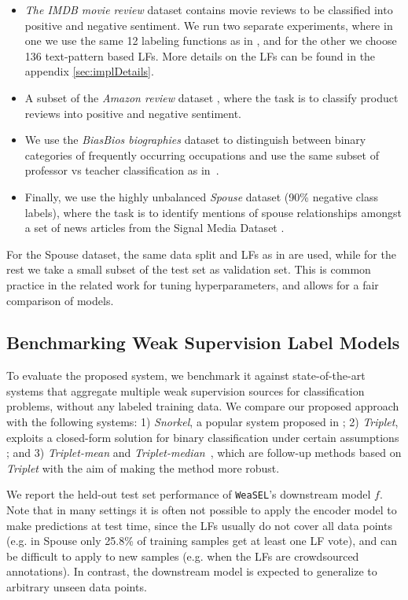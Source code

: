 \documentclass{article}
\newcommand{\weasel}{\texttt{WeaSEL}}\newcommand{\brackets}[1]{\left( #1 \right)}
\begin{document}
\begin{itemize}
    \item 
    \textit{The IMDB movie review} dataset \cite{IMDB} contains  movie reviews to be classified into positive and negative sentiment. We run two separate experiments, where in one we use the same 12 labeling functions as in \cite{TripletsMean}, and for the other we choose 136 text-pattern based LFs. More details on the LFs can be found in the appendix \ref{sec:implDetails}.
    \item
    A subset of the \textit{Amazon review} dataset \cite{Amazon}, where the task is to classify product reviews into positive and negative sentiment.
    \item
    We use the \textit{BiasBios biographies} dataset \cite{biasBios} to distinguish between binary categories of frequently occurring occupations and use the same subset of professor vs teacher classification as in~\cite{IWS}.
    \item
    Finally, we use the highly unbalanced \textit{Spouse} dataset (90\% negative class labels), where the task is to identify mentions of spouse relationships amongst a set of news articles from the Signal Media Dataset \cite{Spouses}.
\end{itemize}
For the Spouse dataset, the same data split and LFs as in \cite{triplets} are used, while for the rest we take a small subset of the 
test set as validation set. This is common practice in the related work \cite{Snorkel, Multitask, triplets, IWS} for tuning hyperparameters, and allows for a fair comparison of models.

\subsection{Benchmarking Weak Supervision Label Models}
To evaluate the proposed system, we benchmark it against state-of-the-art systems that aggregate multiple weak supervision sources for classification problems, without any labeled training data.
We compare our proposed approach with the following systems: 1) \emph{Snorkel}, a popular system proposed in \cite{Snorkel, Multitask}; 2) \emph{Triplet}, exploits a closed-form solution for binary classification under certain assumptions \cite{triplets}; and 3) \emph{Triplet-mean} and \emph{Triplet-median}~\cite{TripletsMean}, which are follow-up methods based on \emph{Triplet} with the aim of making the method more robust.


We report the held-out test set performance of \weasel's downstream model $f$. Note that in many settings it is often not possible to apply the encoder model to make predictions at test time, since the LFs usually do not cover all data points (e.g. in Spouse only 25.8\% of training samples get at least one LF vote), and can be difficult to apply to new samples (e.g. when the LFs are crowdsourced annotations). In contrast, the downstream model is expected to generalize to arbitrary unseen data points.
\end{document}
